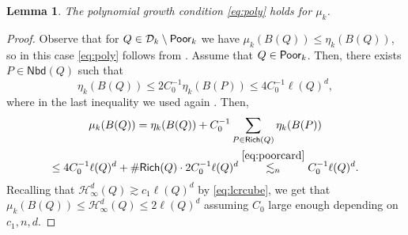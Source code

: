 \documentclass[11pt,reqno]{amsart}
\newtheorem{lemma}[theorem]{Lemma}
\theoremstyle{definition}
\theoremstyle{remark}
\numberwithin{equation}{section}
\newcommand{\hdc}{\mathcal{H}^d_\infty}
\newcommand{\DD}{\mathcal{D}}
\newcommand{\Nei}{\mathsf{Nbd}}
\theoremstyle{theorem}
\theoremstyle{definition}
\theoremstyle{remark}
\numberwithin{equation}{section}
\begin{document}
\begin{lemma}
	The polynomial growth condition \eqref{eq:poly} holds for $\mu_k$.
\end{lemma}
\begin{proof}
	Observe that for $Q\in\DD_k\setminus\Poor_k$ we have $\mu_k(B(Q))\le\eta_{k}(B(Q))$, so in this case \eqref{eq:poly} follows from . Assume that $Q\in\mathsf{Poor}_k$. Then, there exists $P\in\Nei(Q)$ such that
	\begin{equation*}
	\eta_k(B(Q))\le 2 C_0^{-1}\eta_k(B(P))\le 4 C_0^{-1}\ell(Q)^d,
	\end{equation*}
	where in the last inequality we used again . Then,
	\begin{multline*}
	\mu_k(B(Q)) = \eta_k(B(Q)) + C_0^{-1} \sum_{P\in\mathsf{Rich}(Q)} \eta_k(B(P))\\
	 \le 4C_0^{-1}\ell(Q)^d + \#\mathsf{Rich}(Q)\cdot 2C_0^{-1}\ell(Q)^d \overset{\eqref{eq:poorcard}}{\lesssim_n} C_0^{-1}\ell(Q)^d.
	\end{multline*}
	Recalling that $\hdc(Q)\gtrsim c_1\ell(Q)^d$ by \eqref{eq:lcrcube}, we get that $\mu_k(B(Q))\le \hdc(Q)\le 2\ell(Q)^d$ assuming $C_0$ large enough depending on $c_1,n,d$.
\end{proof}
\end{document}
